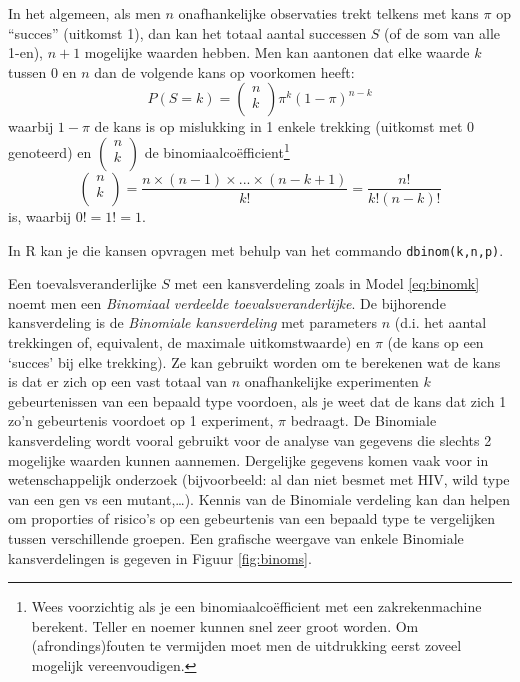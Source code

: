 \documentclass[
  12pt,dutch,coursenotes]{book}
\theoremstyle{definition}
\theoremstyle{definition}
\theoremstyle{definition}
\theoremstyle{remark}
\begin{document}
In het algemeen, als men \(n\) onafhankelijke observaties trekt telkens met kans \(\pi\) op ``succes'' (uitkomst 1), dan kan het totaal aantal successen
\(S\) (of de som van alle 1-en), \(n+1\) mogelijke waarden hebben. Men kan
aantonen dat elke waarde \(k\) tussen 0 en \(n\) dan de volgende kans op
voorkomen heeft:
\begin{equation}
P(S=k) = \left (
\begin{array}{c}
n \\
k \\
\end{array}
\right ) \pi^k (1-\pi)^{n-k}  \label{eq:binomk}
\end{equation}
waarbij \(1-\pi\) de kans is op mislukking in 1 enkele trekking (uitkomst met 0 genoteerd) en
\(\left(\begin{array}{c} n \\ k \\ \end{array}\right)\) de binomiaalcoëfficient\footnote{Wees voorzichtig als je een binomiaalcoëfficient met een zakrekenmachine
  berekent. Teller en noemer kunnen snel zeer groot worden. Om (afrondings)fouten te vermijden moet men de uitdrukking eerst zoveel
  mogelijk vereenvoudigen.}\\
\begin{equation*}
\left (
\begin{array}{c}
n \\
k \\
\end{array}
\right ) = \frac{n \times (n-1) \times ...\times (n-k+1) }{ k!} = \frac{ n!}{ k!(n-k)! }
\end{equation*}
is, waarbij \(0!=1!=1\).

In R kan je die kansen opvragen met behulp van het commando \texttt{dbinom(k,n,p)}.

Een toevalsveranderlijke \(S\) met een kansverdeling zoals in Model \eqref{eq:binomk} noemt men een \emph{Binomiaal verdeelde toevalsveranderlijke}. De bijhorende kansverdeling is de \emph{Binomiale kansverdeling} met
parameters \(n\) (d.i. het aantal trekkingen of, equivalent, de maximale
uitkomstwaarde) en \(\pi\) (de kans op een `succes' bij elke trekking). Ze
kan gebruikt worden om te berekenen wat de kans is dat er zich op een vast
totaal van \(n\) onafhankelijke experimenten \(k\) gebeurtenissen van een
bepaald type voordoen, als je weet dat de kans dat zich 1 zo'n gebeurtenis
voordoet op 1 experiment, \(\pi\) bedraagt. De Binomiale kansverdeling wordt
vooral gebruikt voor de analyse van gegevens die slechts 2
mogelijke waarden kunnen aannemen.
Dergelijke gegevens komen vaak voor in wetenschappelijk onderzoek (bijvoorbeeld: al dan niet besmet met HIV, wild type van een gen vs een mutant,\ldots).
Kennis van de Binomiale verdeling kan dan helpen om proporties of risico's
op een gebeurtenis van een bepaald type te vergelijken tussen verschillende
groepen. Een grafische weergave van enkele Binomiale kansverdelingen is
gegeven in Figuur \ref{fig:binoms}.
\end{document}
